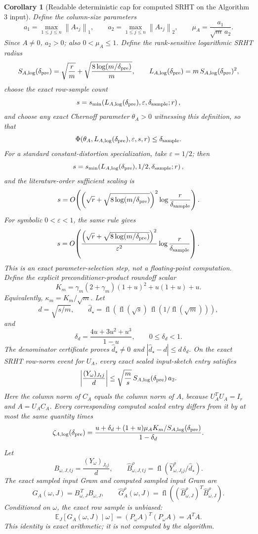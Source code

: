 \documentclass[11pt]{article}
\newcommand{\Exp}{\mathbb{E}}
\newcommand{\Norm}[1]{\left\lVert #1\right\rVert_2}
\newcommand{\NormOne}[1]{\left\lVert #1\right\rVert_1}
\newcommand{\fl}{\operatorname{fl}}
\newcommand{\I}{I}
\newcommand{\eps}{\varepsilon}
\newtheorem{corollary}[theorem]{Corollary}
\theoremstyle{remark}
\begin{document}
\begin{corollary}[Readable deterministic cap for computed SRHT on the Algorithm 3 input]
Define the column-size parameters
\[
  a_1=\max_{1\le j\le n}\NormOne{A_{*j}},
  \qquad
  a_2=\max_{1\le j\le n}\Norm{A_{*j}},
  \qquad
  \mu_A=\frac{a_1}{\sqrt m\,a_2}.
\]
Since \(A\ne0\), \(a_2>0\); also \(0<\mu_A\le1\).  Define the
rank-sensitive logarithmic SRHT radius
\[
  S_{A,\log}(\delta_{\rm pre})
  =
  \sqrt{\frac rm}
  +
  \sqrt{\frac{8\log(m/\delta_{\rm pre})}{m}},
  \qquad
  L_{A,\log}(\delta_{\rm pre})
  =
  m\,S_{A,\log}(\delta_{\rm pre})^2,
\]
choose the exact row-sample count
\[
  s
  =
  s_{\min}\!\left(
    L_{A,\log}(\delta_{\rm pre}),
    \eps,
    \delta_{\rm sample};
    r
  \right),
\]
and choose any exact Chernoff parameter \(\theta_A>0\) witnessing this
definition, so that
\[
  \Phi(\theta_A,L_{A,\log}(\delta_{\rm pre}),\eps,s,r)
  \le\delta_{\rm sample}.
\]
For a standard constant-distortion specialization, take \(\eps=1/2\); then
\[
  s
  =
  s_{\min}\!\left(
    L_{A,\log}(\delta_{\rm pre}),
    1/2,
    \delta_{\rm sample};
    r
  \right),
\]
and the literature-order sufficient scaling is
\[
  s
  =
  O\!\left(
    \left(
      \sqrt r+\sqrt{8\log(m/\delta_{\rm pre})}
    \right)^2
    \log\frac{r}{\delta_{\rm sample}}
  \right).
\]
For symbolic \(0<\eps<1\), the same rule gives
\[
  s
  =
  O\!\left(
    \frac{
      \left(
        \sqrt r+\sqrt{8\log(m/\delta_{\rm pre})}
      \right)^2
    }{\eps^2}
    \log\frac{r}{\delta_{\rm sample}}
  \right).
\]
This is an exact parameter-selection step, not a floating-point computation.
Define the explicit preconditioner-product roundoff scalar
\[
  K_m
  =
  \gamma_m(2+\gamma_m)(1+u)^2+u(1+u)+u .
\]
Equivalently, \(\kappa_m=K_m/\sqrt m\).  Let
\[
  d=\sqrt{s/m},
  \qquad
  \widehat d_\star
  =
  \fl\!\left(
    \fl(\sqrt{s})\,\fl(1/\fl(\sqrt m))
  \right),
\]
and
\[
  \delta_d=\frac{4u+3u^2+u^3}{1-u},
  \qquad 0\le\delta_d<1 .
\]
The denominator certificate proves
\(\widehat d_\star\ne0\) and
\(|\widehat d_\star-d|\le d\,\delta_d\).
On the exact SRHT row-norm event for \(U_A\), every exact scaled input-sketch
entry satisfies
\[
  \left|
    \frac{(Y_\omega)_{J_tj}}{d}
  \right|
  \le
  \sqrt{\frac ms}\,S_{A,\log}(\delta_{\rm pre})\,a_2 .
\]
Here the column norm of \(C_A\) equals the column norm of \(A\), because
\(U_A^TU_A=\I_r\) and \(A=U_AC_A\).
Every corresponding computed scaled entry differs from it by at most the same
quantity times
\[
  \zeta_{A,\log}(\delta_{\rm pre})
  =
  \frac{
    u+\delta_d+
    (1+u)\mu_AK_m/S_{A,\log}(\delta_{\rm pre})
  }{1-\delta_d}.
\]

Let
\[
  B_{\omega,J,tj}=\frac{(Y_\omega)_{J_tj}}{d},
  \qquad
  \widehat B^\rho_{\omega,J,tj}
  =
  \fl\!\left(\widehat Y^\rho_{\omega,J_tj}/\widehat d_\star\right).
\]
The exact sampled input Gram and computed sampled input Gram are
\[
  G_A(\omega,J)=B_{\omega,J}^{\,T}B_{\omega,J},
  \qquad
  \widehat G_A^\rho(\omega,J)
  =
  \fl\!\left((\widehat B^\rho_{\omega,J})^T
             \widehat B^\rho_{\omega,J}\right).
\]
Conditioned on \(\omega\), the exact row sample is unbiased:
\[
  \Exp_J[G_A(\omega,J)\mid\omega]
  =
  (P_\omega A)^T(P_\omega A)
  =
  A^TA .
\]
This identity is exact arithmetic; it is not computed by the algorithm.


\end{corollary}
\end{document}
